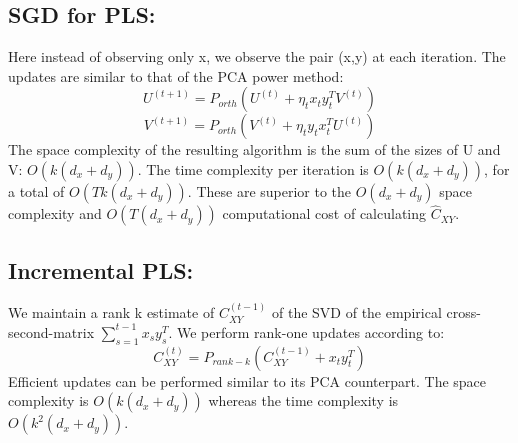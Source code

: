 \documentclass{article}
\begin{document}
\subsection{SGD for PLS:}
Here instead of observing only x, we observe the pair (x,y) at each iteration. The updates are similar to that of the PCA power method:
\begin{equation}
    U^{\left( t+1\right) }=P_{orth}\left( U^{\left( t\right) }+\eta _{t}x_{t}y^{T}_{t}V^{\left( t\right) }\right) 
\end{equation}
\begin{equation}
    V^{\left( t+1\right) }=P_{orth}\left( V^{\left( t\right) }+\eta _{t}y_{t}x^{T}_{t}U^{\left( t\right) }\right) 
\end{equation}
The space complexity of the resulting algorithm is the sum
of the sizes of U and V: $O\left( k\left( d_{x}+d_{y}\right) \right) $. The time complexity per iteration is $O\left( k\left( d_{x}+d_{y}\right) \right) $, for a total of $O\left( Tk\left( d_{x}+d_{y}\right) \right) $. These are superior to the $O\left( d_{x}+d_{y}\right) $ space complexity and $O\left( T\left( d_{x}+d_{y}\right) \right) $ computational cost of calculating $\widehat {C}_{XY}$.

\subsection{Incremental PLS:}
We maintain a rank k estimate of $C^{\left( t-1\right) }_{XY}$ of the SVD of the empirical cross-second-matrix $\sum ^{t-1}_{s=1}x_{s}y^{T}_{s}$. We perform rank-one updates according to:
\begin{equation}
    C^{\left( t\right) }_{XY}=P_{rank-k}\left( C^{\left( t-1\right) }_{XY}+x_{t}y^{T}_{t}\right) 
\end{equation}
Efficient updates can be performed similar to its PCA counterpart. The space complexity is $O\left( k\left( d_{x}+d_{y}\right) \right) $ whereas the time complexity is $O\left( k^{2}\left( d_{x}+d_{y}\right) \right)$.
\end{document}
